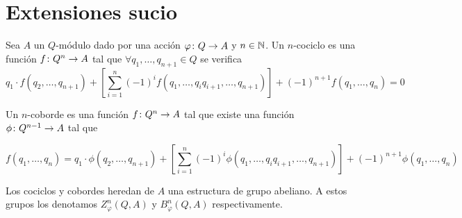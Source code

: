 
\chapter{Extensiones sucio}




\begin{definicion}
	Sea $A$ un $Q$-módulo dado por una acción $\varphi\colon Q\to A$ y $n\in\mathbb{N}$. 
	Un $n$-cociclo es una función $f\colon Q^n\to A$ tal que $\forall q_1,\hdots,q_{n+1}\in Q$ se verifica
	\begin{equation*}
		q_1\cdot f(q_2,\hdots,q_{n+1}) + \left[\sum\limits_{i=1}^{n}(-1)^i f(q_1,\hdots,q_iq_{i+1},\hdots,q_{n+1}) \right] + (-1)^{n+1}f(q_1,\hdots,q_n) = 0
	\end{equation*}
	
	Un $n$-coborde es una función $f\colon Q^n\to A$ tal que existe una función $\phi\colon Q^{n-1}\to A$ tal que
	
	\begin{equation*}
		f(q_1,\hdots, q_n) = q_1\cdot \phi(q_2,\hdots,q_{n+1}) + \left[\sum\limits_{i=1}^{n}(-1)^i \phi(q_1,\hdots,q_iq_{i+1},\hdots,q_{n+1}) \right] + (-1)^{n+1}\phi(q_1,\hdots,q_n)
	\end{equation*} 
	
	Los cociclos y cobordes heredan de $A$ una estructura de grupo abeliano. A estos grupos los denotamos $Z^n_\varphi(Q,A)$ y $B^n_\varphi(Q,A)$ respectivamente.
\end{definicion}

